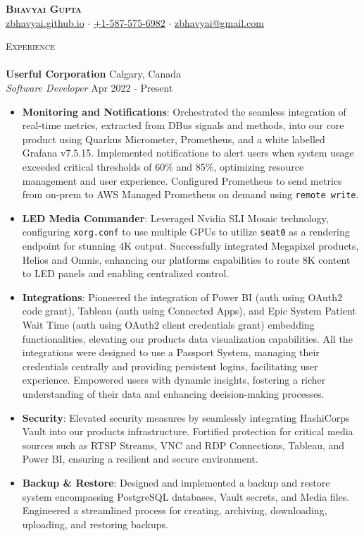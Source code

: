 \documentclass[a4paper]{article}
\newcommand{\lineunder} {
    \vspace*{-8pt} \\
    \hspace*{-18pt} \hrulefill \\
}
\newcommand{\header} [1] {
    \vspace*{5pt}
    {\hspace*{-18pt}\vspace*{6pt} \large\textsc{#1}}
    \vspace*{-6pt} \lineunder
}
\newcommand{\resumeHeadingExperience}[4]{
    \textbf{#1} \hfill {#2}\\
    \textit{#3} \hfill {#4}\\
    \vspace{-3mm}
}
\newcommand{\resumeItemExperience}[2]{
  \item{
    \begin{justify}
    \setlength{\rightskip}{0.15in} \textbf{#1}{: #2 \vspace{-2pt}}
    \end{justify}
  }
}
\begin{document}
\vspace*{-40pt}


\vspace*{-10pt}
\begin{center}
    \textbf{\Huge \scshape {Bhavyai Gupta}}\\
    \href{https://zbhavyai.github.io}{zbhavyai.github.io} $\cdot$ \href{tel:+15875756982}{+1-587-575-6982} $\cdot$ \href{mailto:zbhavyai@gmail.com}{zbhavyai@gmail.com} \\
\end{center}


\header{Experience}

\resumeHeadingExperience {Userful Corporation} {Calgary, Canada} {Software Developer} {Apr 2022 - Present}
\begin{itemize} \itemsep 1pt
    \resumeItemExperience {Monitoring and Notifications}{Orchestrated the seamless integration of real-time metrics, extracted from DBus signals and methods, into our core product using Quarkus Micrometer, Prometheus, and a white labelled Grafana v7.5.15. Implemented notifications to alert users when system usage exceeded critical thresholds of 60\% and 85\%, optimizing resource management and user experience. Configured Prometheus to send metrics from on-prem to AWS Managed Prometheus on demand using \texttt{remote write}.}
    \resumeItemExperience {LED Media Commander} {Leveraged Nvidia SLI Mosaic technology, configuring \texttt{xorg.conf} to use multiple GPUs to utilize \texttt{seat0} as a rendering endpoint for stunning 4K output. Successfully integrated Megapixel products, Helios and Omnis, enhancing our platform\textquotesingle{}s capabilities to route 8K content to LED panels and enabling centralized control.}
    \resumeItemExperience{Integrations} {Pioneered the integration of Power BI (auth using OAuth2 code grant), Tableau (auth using Connected Apps), and Epic System Patient Wait Time (auth using OAuth2 client credentials grant) embedding functionalities, elevating our product\textquotesingle{}s data visualization capabilities. All the integrations were designed to use a \textquotesingle{}Passport System\textquotesingle{}, managing their credentials centrally and providing persistent logins, facilitating user experience. Empowered users with dynamic insights, fostering a richer understanding of their data and enhancing decision-making processes.}
    \resumeItemExperience{Security} {Elevated security measures by seamlessly integrating HashiCorp\textquotesingle{}s Vault into our product\textquotesingle{}s infrastructure. Fortified protection for critical media sources such as RTSP Streams, VNC and RDP Connections, Tableau, and Power BI, ensuring a resilient and secure environment.}
    \resumeItemExperience{Backup \& Restore} {Designed and implemented a backup and restore system encompassing PostgreSQL databases, Vault secrets, and Media files. Engineered a streamlined process for creating, archiving, downloading, uploading, and restoring backups.}
\end{itemize}
\end{document}
